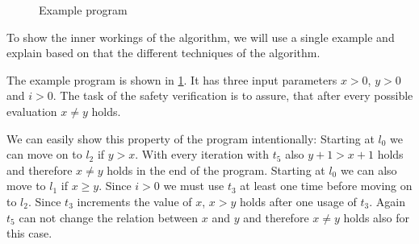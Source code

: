 \begin{figure}
\centering
{}
\caption{Example program}
\label{fig:example}
\end{figure}

To show the inner workings of the algorithm, we will use a single example and explain based on that the different techniques of the algorithm.

The example program is shown in \ref{fig:example}.
It has three input parameters $x>0$, $y>0$ and $i>0$.
The task of the safety verification is to assure, that after every possible evaluation $x \neq y$ holds.

We can easily show this property of the program intentionally:
Starting at $l_0$ we can move on to $l_2$ if $y>x$.
With every iteration with $t_5$ also $y+1>x+1$ holds and therefore $x \neq y$ holds in the end of the program.
Starting at $l_0$ we can also move to $l_1$ if $x \geq y$.
Since $i>0$ we must use $t_3$ at least one time before moving on to $l_2$.
Since $t_3$ increments the value of $x$, $x > y$ holds after one usage of $t_3$.
Again $t_5$ can not change the relation between $x$ and $y$ and therefore $x \neq y$ holds also for this case.

